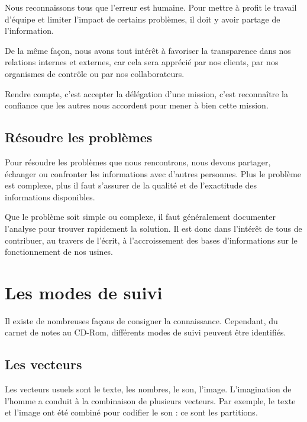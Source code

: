Nous reconnaissons tous que l’erreur est humaine. Pour mettre à profit le travail d’équipe et limiter l’impact de certains problèmes, il doit y avoir partage de l’information.
\vspace{0.3cm}


De la même façon, nous avons tout intérêt à favoriser la transparence dans nos relations internes et externes, car cela sera apprécié par nos clients, par nos organismes de contrôle ou par nos collaborateurs.
\vspace{0.3cm}

Rendre compte, c’est accepter la délégation d’une mission, c’est reconnaître la confiance que les autres nous accordent pour mener à bien cette mission.


\subsection{	Résoudre les problèmes}

Pour résoudre les problèmes que nous rencontrons, nous devons partager, échanger ou confronter les informations avec d’autres personnes. Plus le problème est complexe, plus il faut s’assurer de la qualité et de l’exactitude des informations disponibles.
\vspace{0.3cm}

Que le problème soit simple ou complexe, il faut généralement documenter l’analyse pour trouver rapidement la solution. Il est donc dans l’intérêt de tous de contribuer, au travers de l’écrit, à l’accroissement des bases d’informations sur le fonctionnement de nos usines.



\section{Les modes de suivi}


Il existe de nombreuses façons de consigner la connaissance. Cependant, du carnet de notes au CD-Rom, différents modes de suivi peuvent être identifiés.


\subsection{Les vecteurs}

Les vecteurs usuels sont le texte, les nombres, le son, l’image.
L’imagination de l’homme a conduit à la combinaison de plusieurs vecteurs. Par exemple, le texte et l’image ont été combiné pour codifier le son : ce sont les partitions.
\vspace{0.3cm}

